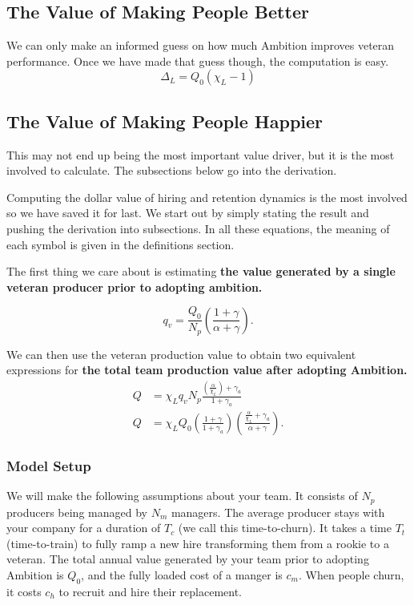 \documentclass[paper=a4, fontsize=11pt abstract]{scrartcl}
\numberwithin{equation}{section}		%
\numberwithin{figure}{section}			%
\numberwithin{table}{section}				%
\begin{document}
\subsection{The Value of Making People Better}
We can only make an informed guess on how much Ambition improves veteran performance.
Once we have made that guess though, the computation is easy.
\begin{equation}
    \Delta_L = Q_0\left(\chi_L - 1\right)
\end{equation}


\subsection{The Value of Making People Happier}
This may not end up being the most important value driver, but it is the most involved to calculate.
The subsections below go into the derivation.


Computing the dollar value of hiring and retention dynamics is the most involved so we have saved it for last.  We start out by simply stating the result and pushing the derivation into subsections. In all these equations, the meaning of each symbol is given in the definitions section.

The first thing we care about is estimating \textbf{the value generated by a single veteran producer prior to adopting ambition.}

\begin{equation}
    q_{v} = \frac{Q_0}{N_p}\left(\frac{1 + \gamma}{\alpha + \gamma}\right).
\end{equation}

We can then use the veteran production value to obtain two equivalent expressions for \textbf{the total team production value after adopting Ambition.}
\begin{align}
    Q &= \chi_L q_{v} N_p\frac{\left(\frac{\alpha}{\chi_L}\right) + \gamma_a}{1 + \gamma_a} \label{Q0} \\
    Q &= \chi_L Q_0  \left(\frac{1+\gamma}{1 + \gamma_a}\right) \left(\frac{\frac{\alpha}{\chi_L} + \gamma_a  }{\alpha + \gamma}\right).
\end{align}

\subsubsection{Model Setup}
We will make the following assumptions about your team.  It consists of $N_p$ producers being managed by $N_m$ managers.  The average producer stays with your company for a duration of $T_c$ (we call this time-to-churn).  It takes a time $T_t$ (time-to-train) to fully ramp a new hire transforming them from a rookie to a veteran. The total annual value generated by your team prior to adopting Ambition is $Q_0$, and the fully loaded cost of a manger is $c_m$.  When people churn, it costs $c_h$ to recruit and hire their replacement.
\end{document}
